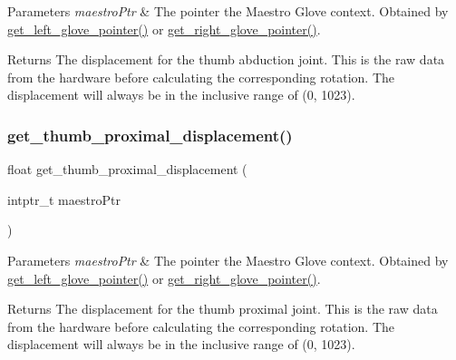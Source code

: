 \begin{DoxyParams}{Parameters}
{\em maestro\+Ptr} & The pointer the Maestro Glove context. Obtained by \hyperlink{group__glove_management_ga63ce3c99d4a8b8db851b22af9185764e}{get\+\_\+left\+\_\+glove\+\_\+pointer()} or \hyperlink{group__glove_management_ga9b8fd9d91aeac3f8da50f7a7eba0c32b}{get\+\_\+right\+\_\+glove\+\_\+pointer()}. \\
\hline
\end{DoxyParams}
\begin{DoxyReturn}{Returns}
The displacement for the thumb abduction joint. This is the raw data from the hardware before calculating the corresponding rotation. The displacement will always be in the inclusive range of (0, 1023). 
\end{DoxyReturn}
\mbox{\label{group__displacement_access_ga86d0adfde28a3008a21fb4620e4b93df}} 
\subsubsection{\texorpdfstring{get\+\_\+thumb\+\_\+proximal\+\_\+displacement()}{get\_thumb\_proximal\_displacement()}}
{\footnotesize\ttfamily float get\+\_\+thumb\+\_\+proximal\+\_\+displacement (\begin{DoxyParamCaption}\item[{intptr\+\_\+t}]{maestro\+Ptr }\end{DoxyParamCaption})}


\begin{DoxyParams}{Parameters}
{\em maestro\+Ptr} & The pointer the Maestro Glove context. Obtained by \hyperlink{group__glove_management_ga63ce3c99d4a8b8db851b22af9185764e}{get\+\_\+left\+\_\+glove\+\_\+pointer()} or \hyperlink{group__glove_management_ga9b8fd9d91aeac3f8da50f7a7eba0c32b}{get\+\_\+right\+\_\+glove\+\_\+pointer()}. \\
\hline
\end{DoxyParams}
\begin{DoxyReturn}{Returns}
The displacement for the thumb proximal joint. This is the raw data from the hardware before calculating the corresponding rotation. The displacement will always be in the inclusive range of (0, 1023). 
\end{DoxyReturn}
\mbox{\label{group__displacement_access_gab799e09f1b944ca87b1567a9a9ae2ee4}} 
